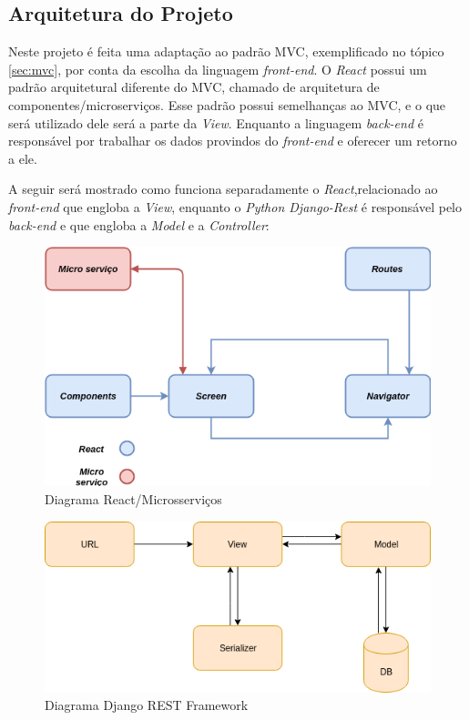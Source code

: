 \subsection{Arquitetura do Projeto}

Neste projeto é feita uma adaptação ao padrão MVC, exemplificado no tópico \ref{sec:mvc}, por conta da escolha da linguagem \textit{front-end}. O \textit{React} possui um padrão arquitetural diferente do MVC, chamado de arquitetura de componentes/microserviços. Esse padrão possui semelhanças ao MVC, e o que será utilizado dele será a parte da \textit{View}. Enquanto a linguagem \textit{back-end} é responsável por trabalhar os dados provindos do \textit{front-end} e oferecer um retorno a ele. 

A seguir será mostrado como funciona separadamente o \textit{React},relacionado ao \textit{front-end} que engloba a \textit{View}, enquanto o \textit{Python Django-Rest} é responsável pelo \textit{back-end} e que engloba a \textit{Model} e a \textit{Controller}:

\begin{figure}[H]
	\centering
	\includegraphics[width=1.0\textwidth]{figuras/diagrama_react.png}
	\caption{Diagrama React/Microsserviços}
	\label{img:diagrama_react}
\end{figure}

\begin{figure}[H]
	\centering
	\includegraphics[width=1.0\textwidth]{figuras/django_rest.png}
	\caption{Diagrama Django REST Framework}
	\label{img:diagrama_rest}
\end{figure}


